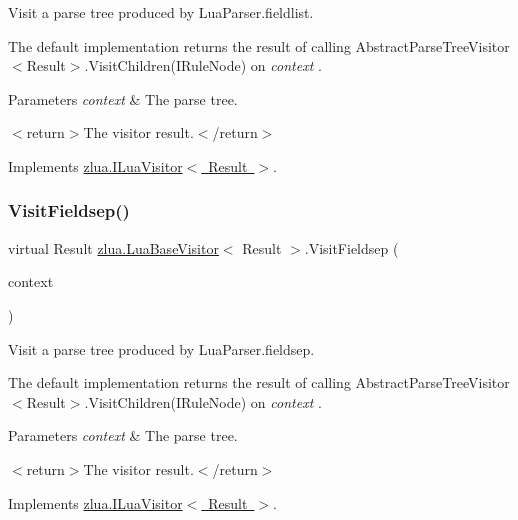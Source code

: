 Visit a parse tree produced by Lua\+Parser.\+fieldlist. 

The default implementation returns the result of calling Abstract\+Parse\+Tree\+Visitor$<$\+Result$>$.\+Visit\+Children(\+I\+Rule\+Node) on {\itshape context} . 


\begin{DoxyParams}{Parameters}
{\em context} & The parse tree.\\
\hline
\end{DoxyParams}
$<$return$>$The visitor result.$<$/return$>$ 

Implements \mbox{\hyperlink{interfacezlua_1_1_i_lua_visitor_a5e96f0fd7b286fbdbac993c6832ee7af}{zlua.\+I\+Lua\+Visitor$<$ Result $>$}}.

\mbox{\label{classzlua_1_1_lua_base_visitor_a98d3de2d27762c55d96d41ddac2f8b38}} 
\subsubsection{\texorpdfstring{Visit\+Fieldsep()}{VisitFieldsep()}}
{\footnotesize\ttfamily virtual Result \mbox{\hyperlink{classzlua_1_1_lua_base_visitor}{zlua.\+Lua\+Base\+Visitor}}$<$ Result $>$.Visit\+Fieldsep (\begin{DoxyParamCaption}\item[{\mbox{[}\+Not\+Null\mbox{]} \mbox{\hyperlink{classzlua_1_1_lua_parser_1_1_fieldsep_context}{Lua\+Parser.\+Fieldsep\+Context}}}]{context }\end{DoxyParamCaption})\hspace{0.3cm}{\ttfamily [virtual]}}



Visit a parse tree produced by Lua\+Parser.\+fieldsep. 

The default implementation returns the result of calling Abstract\+Parse\+Tree\+Visitor$<$\+Result$>$.\+Visit\+Children(\+I\+Rule\+Node) on {\itshape context} . 


\begin{DoxyParams}{Parameters}
{\em context} & The parse tree.\\
\hline
\end{DoxyParams}
$<$return$>$The visitor result.$<$/return$>$ 

Implements \mbox{\hyperlink{interfacezlua_1_1_i_lua_visitor_a9b0b2dc2b7d35b07f48b025e06b5e8e6}{zlua.\+I\+Lua\+Visitor$<$ Result $>$}}.

